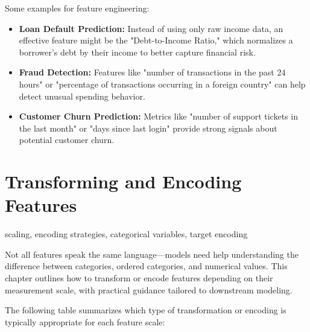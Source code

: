 \documentclass[12pt,openany]{book}
\begin{document}
Some examples for feature engineering:
\begin{itemize}
    \item \textbf{Loan Default Prediction:} Instead of using only raw income data, an effective feature might be the "Debt-to-Income Ratio," which normalizes a borrower’s debt by their income to better capture financial risk.
    \item \textbf{Fraud Detection:} Features like "number of transactions in the past 24 hours" or "percentage of transactions occurring in a foreign country" can help detect unusual spending behavior.
    \item \textbf{Customer Churn Prediction:} Metrics like "number of support tickets in the last month" or "days since last login" provide strong signals about potential customer churn.
\end{itemize}



\section{Transforming and Encoding Features}

\begin{keywordsbox}
scaling, encoding strategies, categorical variables, target encoding \end{keywordsbox}

Not all features speak the same language—models need help understanding the difference between categories, ordered categories, and numerical values. This chapter outlines how to transform or encode features depending on their measurement scale, with practical guidance tailored to downstream modeling.
\newline

The following table summarizes which type of transformation or encoding is typically appropriate for each feature scale:
\end{document}
